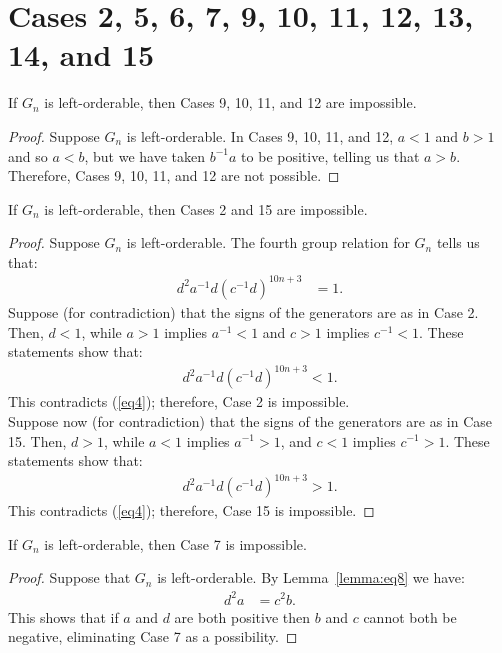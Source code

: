 \section{Cases 2, 5, 6, 7, 9, 10, 11, 12, 13, 14, and 15}
\label{section:manyCases}

\begin{proposition} If $G_n$ is left-orderable, then Cases 9, 10, 11, and 12 are impossible.\label{proposition:case9,10,11,12}
\end{proposition}
\begin{proof} Suppose $G_n$ is left-orderable. In Cases 9, 10, 11, and 12, $a<1$ and $b>1$ and so $a<b$, but we have taken $b^{-1}a$ to be positive, telling us that $a>b$. Therefore, Cases 9, 10, 11, and 12 are not possible.
\end{proof}

\begin{proposition} If $G_n$ is left-orderable, then Cases 2 and 15 are impossible.\label{proposition:case2,15}
\end{proposition}
\begin{proof} Suppose $G_n$ is left-orderable. The fourth group relation for $G_n$ tells us that:
\begin{align}
d^{2}a^{-1}d(c^{-1}d)^{10n+3}&=1.\label{eq4}
\end{align}
Suppose (for contradiction) that the signs of the generators are as in Case 2. Then, $d<1$, while $a>1$ implies $a^{-1}<1$ and $c>1$ implies $c^{-1}<1$. These statements show that:
\begin{align*}
d^{2}a^{-1}d(c^{-1}d)^{10n+3}<1.
\end{align*}
This contradicts (\ref{eq4}); therefore, Case 2 is impossible.\\
\noindent{}Suppose now (for contradiction) that the signs of the generators are as in Case 15. Then, $d>1$, while $a<1$ implies $a^{-1}>1$, and $c<1$ implies $c^{-1}>1$. These statements show that:
\begin{align*}
d^{2}a^{-1}d(c^{-1}d)^{10n+3}>1.
\end{align*}
This contradicts (\ref{eq4}); therefore, Case 15 is impossible.
\end{proof}

\begin{proposition} If $G_n$ is left-orderable, then Case 7 is impossible.
\label{proposition:case7}
\end{proposition}
\begin{proof} Suppose that $G_n$ is left-orderable. By Lemma~\ref{lemma:eq8} we have:
\begin{align*}
d^{2}a&=c^{2}b.
\end{align*}
This shows that if $a$ and $d$ are both positive then $b$ and $c$ cannot both be negative, eliminating Case 7 as a possibility.
\end{proof}

